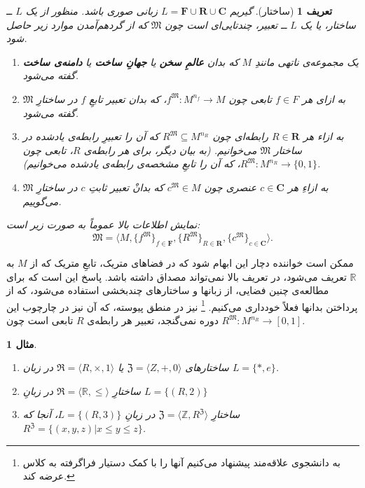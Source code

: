 \documentclass[12pt,a4paper]{report}
\theoremstyle{colorhead}
\newtheorem{mesal}[thm]{مثال}
\newtheorem{defn}[thm]{تعریف}
\begin{document}
\begin{defn}[ساختار]
گیریم
$L=\mathbf{F}\cup \mathbf{R}\cup \mathbf{C}$
زبانی صوری باشد. منظور از یک
$L$
ــ ساختار، یا یک
$L$
ــ تعبیر،
چندتایی‌ای است چون
$\mathfrak{M}$
که از گردهم‌آمدن موارد زیر حاصل شود.
\begin{enumerate}
\item 
یک مجموعه‌ی ناتهی مانندِ
$M$
که بدان 
\textbf{عالمِ سخن}
یا
\textbf{جهانِ ساخت}
یا
\textbf{دامنه‌ی ساخت}
گفته می‌شود.
\item
به ازای هر
$f\in F$
تابعی چون
$f^\mathfrak{M}:M^{n_f}\to M$،
که بدان تعبیر تابعِ 
$f$
در ساختارِ
$\mathfrak{M}$
گفته می‌شود.
\item 
به ازاء هر
$R\in \mathbf{R}$
رابطه‌ای چون
$R^\mathfrak{M}\subseteq M^{n_R}$
که آن را تعبیرِ رابطه‌ی یادشده در ساختار
$\mathfrak{M}$
می‌خوانیم. (به بیان دیگر،
برای هر رابطه‌ی
$R$،
 تابعی چون
$R^\mathfrak{M}:M^{n_R}\to \{0,1\}$، 
که آن را تابع‌ِ مشخصه‌ی رابطه‌ی یادشده می‌خوانیم).
\item
به ازاءِ هر 
$c\in \mathbf{C}$
عنصری چون
$c^{\mathfrak{M}}\in M$
که بدانْ تعبیر ثابتِ 
$c$
در ساختارِ
$\mathfrak{M}$
می‌گوییم.
\end{enumerate}
نمایش اطلاعات بالا عموماً به صورت زیر است:
\[
\mathfrak{M}=\langle M, \{f^\mathfrak{M}\}_{f\in \mathbf{F}}, \{R^\mathfrak{M}\}_{R\in \mathbf{R}}, \{c^\mathfrak{M}\}_{c\in \mathbf{C}}\rangle.
\]
\end{defn}
ممکن است خواننده دچار این ابهام شود که در فضاهای متریک، تابعِ متریک که از
$M$
به
$\mathbb{R}$
تعریف می‌شود، در تعریف بالا نمی‌تواند مصداق داشته باشد. پاسخ این است که برای مطالعه‌ی چنین فضایی، از زبانها و  ساختارهای چندبخشی 
استفاده می‌شود، که از پرداختن بدانها فعلاً خودداری می‌کنیم.
\footnote{ 
به
دانشجوی علاقه‌مند پیشنهاد می‌کنیم آنها را با کمک دستیار فراگرفته به کلاس عرضه کند.}
نیز در منطق پیوسته،
که آن نیز در چارچوب این دوره‌ نمی‌گنجد،
 تعبیر هر رابطه‌ی
$R$
تابعی است چون
$R^\mathfrak{M}:M^{n_R}\to [0,1]$.
\begin{mesal}
\hfill 
\begin{enumerate}
\item 
ساختارهای
$\mathfrak{Z}=\langle Z,+,0\rangle$
یا
$\mathfrak{R}=\langle R,\times, 1\rangle$
در زبان
$L=\{*,e\}$.
\item 
ساختارِ
$\mathfrak{R}=\langle \mathbb{R},\leq\rangle$
در زبانِ
$L=\{(R,2)\}$
\item 
ساختارِ
$\mathfrak{Z}=\langle \mathbb{Z},R^\mathfrak{Z}\rangle$
در زبانِ
$L=\{(R,3)\}$، 
آنجا که
\mbox{$R^\mathfrak{Z}=\{(x,y,z)|x\leq y\leq z\}$}.
\end{enumerate}
\end{mesal}
\end{document}
